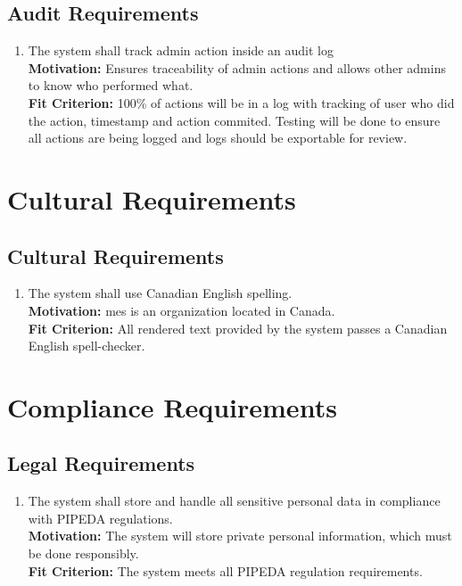 \documentclass[12pt]{article}
\begin{document}
\subsection{Audit Requirements}
\begin{enumerate}[align=left,
  leftmargin=*,
  labelsep=1em,
  itemindent=0em,
  label=\bfseries AU-\arabic*:]
  \item \label{SAuR1} The system shall track admin action inside an audit log\\[2mm]
    {\bf Motivation:} Ensures traceability of admin actions and allows other admins to know who performed what.  \\
    {\bf Fit Criterion:} 100\% of actions will be in a log with tracking of user who did the action, timestamp and action commited. Testing will be done to ensure all actions are being logged and logs should be exportable for review.
\end{enumerate}

\section{Cultural Requirements}
\subsection{Cultural Requirements}
\begin{enumerate}[align=left,
  leftmargin=*,
  labelsep=1em,
  itemindent=0em,
  label=\bfseries CL-\arabic*:]
  \item \label{CR1} The system shall use Canadian English spelling.\\[2mm]
    {\bf Motivation:} \Gls{mes} is an organization located in Canada.\\
    {\bf Fit Criterion:} All rendered text provided by the system passes a Canadian English spell-checker.\\
\end{enumerate}

\section{Compliance Requirements}
\subsection{Legal Requirements}
\begin{enumerate}[align=left,
  leftmargin=*,
  labelsep=1em,
  itemindent=0em,
  label=\bfseries LG-\arabic*:]
  \item \label{CLR1} The system shall store and handle all sensitive personal data in compliance with PIPEDA regulations.\\[2mm]
    {\bf Motivation:} The system will store private personal information, which must be done responsibly.\\
    {\bf Fit Criterion:} The system meets all PIPEDA regulation requirements.\\
\end{enumerate}
\end{document}
